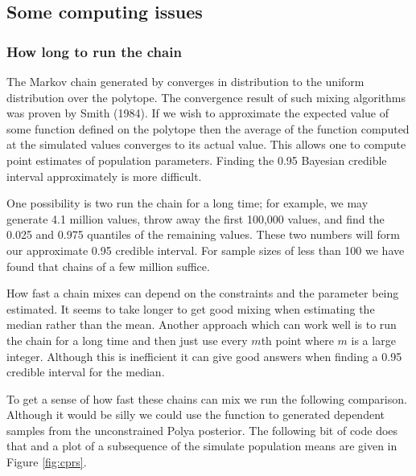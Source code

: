 \documentclass{article}
\begin{document}
\subsection{Some computing issues}

\subsubsection{How long to run the chain}

The Markov chain generated by \verb@constrppmn@  converges in
distribution to the uniform distribution over the polytope. The
convergence result of such mixing algorithms was proven by Smith
(1984). \nocite{smi84} If we wish to approximate the expected
value of some function defined on the polytope then the average
of the function computed at the simulated values converges to its
actual value. This allows one to compute point estimates of
population parameters. Finding the 0.95 Bayesian credible interval
approximately is more difficult.

One possibility is two run the chain for a long time;
for example, we may generate 4.1 million values,
throw away the first 100,000 values, and find the 0.025 and 0.975
quantiles of the remaining values. These two numbers will form our
approximate 0.95 credible interval. For sample sizes 
of less than 100 we have found that chains of a few million suffice.

How fast a chain  mixes can  depend on the constraints and the
parameter being estimated. It seems to take longer to get good
mixing when estimating the median rather than the mean. Another
approach which can work well is to run the chain for a long time
and then just use every $m$th point where $m$ is a large integer.
Although this is inefficient it can give good answers when finding
a 0.95 credible interval for the median.

To get a sense of how fast these chains can mix we run the 
following comparison.
Although it would be silly we could use the function \verb@constrppmn@ to 
generated dependent samples from the unconstrained Polya 
posterior. The following bit of code does that and a plot of a subsequence 
of the simulate population means are given in Figure \ref{fig:cprs}.
\end{document}

